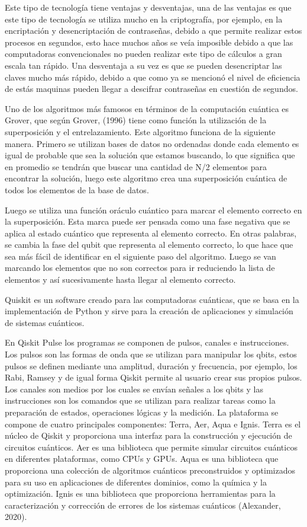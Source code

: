 \documentclass{article}
\begin{document}
Este tipo de tecnología tiene ventajas y desventajas, una de las ventajas es que este tipo de tecnología se utiliza mucho en la criptografía, por ejemplo, en la encriptación y desencriptación de contraseñas, debido a que permite realizar estos procesos en segundos, esto hace muchos años se veía imposible debido a que las computadoras convencionales no pueden realizar este tipo de cálculos a gran escala tan rápido. Una desventaja a su vez es que se pueden desencriptar las claves mucho más rápido, debido a que como ya se mencionó el nivel de eficiencia de estás maquinas pueden llegar a descifrar contraseñas en cuestión de segundos. 

Uno de los algoritmos más famosos en términos de la computación cuántica es Grover, que según Grover, (1996) tiene como función la utilización de la superposición y el entrelazamiento. Este algoritmo funciona de la siguiente manera. Primero se utilizan bases de datos no ordenadas donde cada elemento es igual de probable que sea la solución que estamos buscando, lo que significa que en promedio se tendrán que buscar una cantidad de N/2 elementos para encontrar la solución, luego este algoritmo crea una superposición cuántica de todos los elementos de la base de datos.  

Luego se utiliza una función oráculo cuántico para marcar el elemento correcto en la superposición. Esta marca puede ser pensada como una fase negativa que se aplica al estado cuántico que representa al elemento correcto. En otras palabras, se cambia la fase del qubit que representa al elemento correcto, lo que hace que sea más fácil de identificar en el siguiente paso del algoritmo. Luego se van marcando los elementos que no son correctos para ir reduciendo la lista de elementos y así sucesivamente hasta llegar al elemento correcto. 

Quiskit es un software creado para las computadoras cuánticas, que se basa en la implementación de Python y sirve para la creación de aplicaciones y simulación de sistemas cuánticos.  

En Qiskit Pulse los programas se componen de pulsos, canales e instrucciones. Los pulsos son las formas de onda que se utilizan para manipular los qbits, estos pulsos se definen mediante una amplitud, duración y frecuencia, por ejemplo, los Rabi, Ramsey y de igual forma Qiskit permite al usuario crear sus propios pulsos. Los canales son medios por los cuales se envían señales a los qbits y las instrucciones son los comandos que se utilizan para realizar tareas como la preparación de estados, operaciones lógicas y la medición.
La plataforma se compone de cuatro principales componentes: Terra, Aer, Aqua e Ignis. Terra es el núcleo de Qiskit y proporciona una interfaz para la construcción y ejecución de circuitos cuánticos. Aer es una biblioteca que permite simular circuitos cuánticos en diferentes plataformas, como CPUs y GPUs. Aqua es una biblioteca que proporciona una colección de algoritmos cuánticos preconstruidos y optimizados para su uso en aplicaciones de diferentes dominios, como la química y la optimización. Ignis es una biblioteca que proporciona herramientas para la caracterización y corrección de errores de los sistemas cuánticos (Alexander, 2020). 
\end{document}

